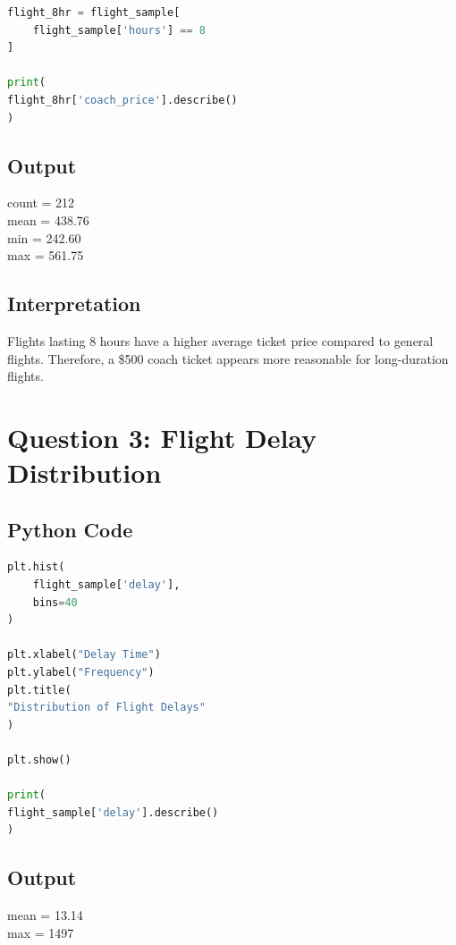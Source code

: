 \documentclass[12pt,a4paper]{article}
\begin{document}
\begin{lstlisting}[language=Python]
flight_8hr = flight_sample[
    flight_sample['hours'] == 8
]

print(
flight_8hr['coach_price'].describe()
)
\end{lstlisting}

\subsection{Output}

\begin{tcolorbox}[colback=lightblue]
count = 212 \\
mean = 438.76 \\
min = 242.60 \\
max = 561.75
\end{tcolorbox}

\subsection{Interpretation}

Flights lasting 8 hours have a higher average ticket price compared to general flights. Therefore, a \$500 coach ticket appears more reasonable for long-duration flights.

\section{Question 3: Flight Delay Distribution}

\subsection{Python Code}

\begin{lstlisting}[language=Python]
plt.hist(
    flight_sample['delay'],
    bins=40
)

plt.xlabel("Delay Time")
plt.ylabel("Frequency")
plt.title(
"Distribution of Flight Delays"
)

plt.show()

print(
flight_sample['delay'].describe()
)
\end{lstlisting}

\subsection{Output}

\begin{tcolorbox}[colback=lightblue]
mean = 13.14 \\
max = 1497
\end{tcolorbox}
\end{document}
